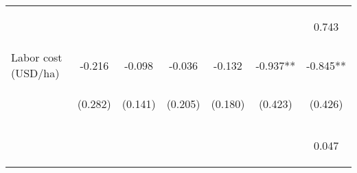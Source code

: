 \begin{center}
\begin{tabular}{lcccccc}
\vspace{4pt} & \begin{footnotesize}[0.028]\end{footnotesize} & \begin{footnotesize}[0.127]\end{footnotesize} & \begin{footnotesize}[0.238]\end{footnotesize} & \begin{footnotesize}[0.483]\end{footnotesize} & \begin{footnotesize}[0.977]\end{footnotesize} & \begin{footnotesize}0.743\end{footnotesize} \\
Labor cost (USD/ha) & -0.216 & -0.098 & -0.036 & -0.132 & -0.937** & -0.845** \\
 & \begin{footnotesize}(0.282)\end{footnotesize} & \begin{footnotesize}(0.141)\end{footnotesize} & \begin{footnotesize}(0.205)\end{footnotesize} & \begin{footnotesize}(0.180)\end{footnotesize} & \begin{footnotesize}(0.423)\end{footnotesize} & \begin{footnotesize}(0.426)\end{footnotesize} \\
\vspace{4pt} & \begin{footnotesize}[0.444]\end{footnotesize} & \begin{footnotesize}[0.487]\end{footnotesize} & \begin{footnotesize}[0.861]\end{footnotesize} & \begin{footnotesize}[0.464]\end{footnotesize} & \begin{footnotesize}[0.027]\end{footnotesize} & \begin{footnotesize}0.047\end{footnotesize} \\

\end{tabular}
\end{center}
